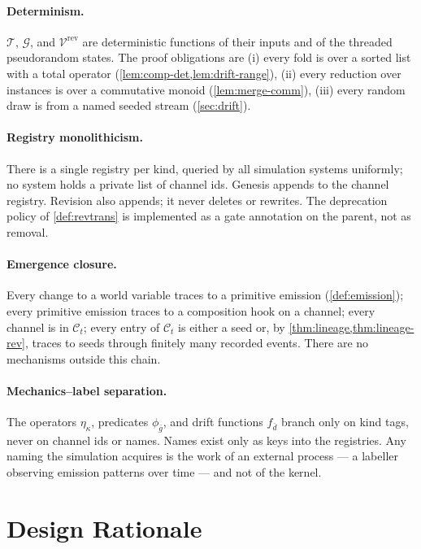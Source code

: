 \documentclass[journal,onecolumn,11pt]{IEEEtran}
\theoremstyle{definition}
\begin{document}
\paragraph{Determinism.} $\mathcal{T}$, $\mathcal{G}$, and $\mathcal{V}^{\mathrm{rev}}$ are deterministic functions of their inputs and of the threaded pseudorandom states. The proof obligations are (i) every fold is over a sorted list with a total operator (\cref{lem:comp-det,lem:drift-range}), (ii) every reduction over instances is over a commutative monoid (\cref{lem:merge-comm}), (iii) every random draw is from a named seeded stream (\cref{sec:drift}).

\paragraph{Registry monolithicism.} There is a single registry per kind, queried by all simulation systems uniformly; no system holds a private list of channel ids. Genesis appends to the channel registry. Revision also appends; it never deletes or rewrites. The deprecation policy of \cref{def:revtrans} is implemented as a gate annotation on the parent, not as removal.

\paragraph{Emergence closure.} Every change to a world variable traces to a primitive emission (\cref{def:emission}); every primitive emission traces to a composition hook on a channel; every channel is in $\mathcal{C}_t$; every entry of $\mathcal{C}_t$ is either a seed or, by \cref{thm:lineage,thm:lineage-rev}, traces to seeds through finitely many recorded events. There are no mechanisms outside this chain.

\paragraph{Mechanics--label separation.} The operators $\eta_\kappa$, predicates $\phi_{\bar{g}}$, and drift functions $f_{\bar{d}}$ branch only on kind tags, never on channel ids or names. Names exist only as keys into the registries. Any naming the simulation acquires is the work of an external process --- a labeller observing emission patterns over time --- and not of the kernel.

\section{Design Rationale}
\label{sec:rationale}
\end{document}
